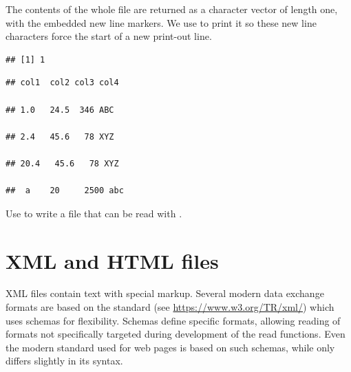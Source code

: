 \documentclass[krantz2]{krantz}\usepackage{knitr}
\begin{document}
The contents of the whole file are returned as a character vector of length one, with the embedded new line markers. We use  to print it so these new line characters force the start of a new print-out line.

\begin{knitrout}\footnotesize
{}\color{fgcolor}\begin{kframe}
\begin{alltt}
 \hlkwb{<-} \hlstd{(} \hlstd{=} \hlstd{)}
\end{alltt}
\begin{verbatim}
## [1] 1
\end{verbatim}
\begin{alltt}
\end{alltt}
\begin{verbatim}
## col1  col2 col3 col4

## 1.0   24.5  346 ABC

## 2.4   45.6   78 XYZ

## 20.4   45.6   78 XYZ

##  a    20     2500 abc

\end{verbatim}
\end{kframe}
\end{knitrout}

\begin{advplayground}
Use  to write a file that can be read with .
\end{advplayground}

\section{XML and HTML files}

XML files contain text with special markup. Several modern data exchange formats are based on the  standard (see \url{https://www.w3.org/TR/xml/}) which uses schemas for flexibility. Schemas define specific formats, allowing reading of formats not specifically targeted during development of the read functions. Even the modern  standard used for web pages is based on such schemas, while  only differs slightly in its syntax.
\end{document}
